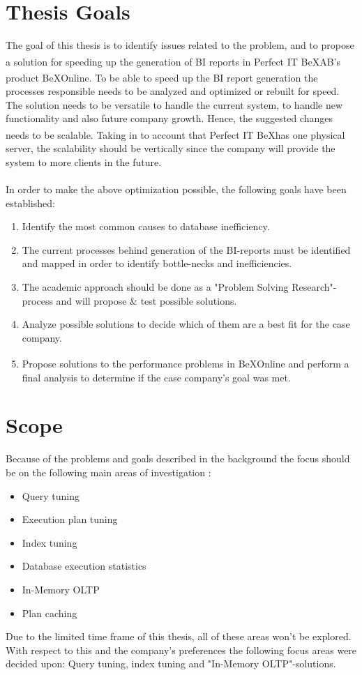 \documentclass{cslthse-msc}
\newcommand{\bex}{BeX\textsuperscript{\textregistered}}
\begin{document}
\section{Thesis Goals} \label{sec:goals}
The goal of this thesis is to identify issues related to the problem, and to propose a solution for speeding up the generation of BI reports in Perfect IT \bex AB's product \bex Online. To be able to speed up the BI report generation the processes responsible needs to be analyzed and optimized or rebuilt for speed. The solution needs to be versatile to handle the current system, to handle new functionality and also future company growth. Hence, the suggested changes needs to be scalable. Taking in to account that Perfect IT \bex has one physical server, the scalability should be vertically \cite{scalability} since the company will provide the system to more clients in the future.\\\\
In order to make the above optimization possible, the following goals have been established:
\begin{enumerate}
\item Identify the most common causes to database inefficiency.
\item The current processes behind generation of the BI-reports must be identified and mapped in order to identify bottle-necks and inefficiencies.
\item The academic approach should be done as a "Problem Solving Research"-process and will propose \& test possible solutions.
\item Analyze possible solutions to decide which of them are a best fit for the case company.
\item Propose solutions to the performance problems in \bex Online and perform a final analysis to determine if the case company's goal was met.
\end{enumerate}
  
\section{Scope} \label{sec:scope}
Because of the problems and goals described in the background the focus should be on the following main areas of investigation \cite{Nevarez}:
\begin{itemize}
\item Query tuning
\item Execution plan tuning
\item Index tuning
\item Database execution statistics
\item In-Memory OLTP
\item Plan caching
\end{itemize}
Due to the limited time frame of this thesis, all of these areas won't be explored. With respect to this and the company's preferences the following focus areas were decided upon: Query tuning, index tuning and "In-Memory OLTP"-solutions.
\end{document}
